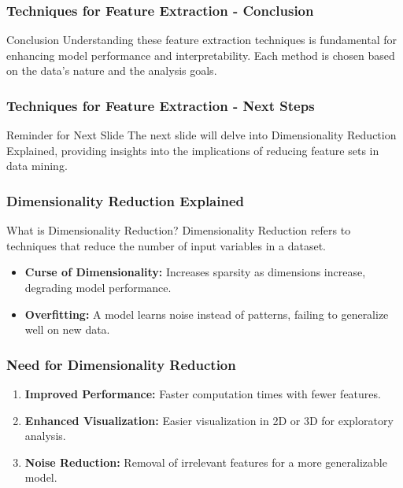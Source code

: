 \documentclass[aspectratio=169]{beamer}
\begin{document}
\begin{frame}[fragile]
    \frametitle{Techniques for Feature Extraction - Conclusion}
    \begin{block}{Conclusion}
        Understanding these feature extraction techniques is fundamental for enhancing model performance and interpretability. 
        Each method is chosen based on the data's nature and the analysis goals.
    \end{block}
\end{frame}

\begin{frame}[fragile]
    \frametitle{Techniques for Feature Extraction - Next Steps}
    \begin{block}{Reminder for Next Slide}
        The next slide will delve into Dimensionality Reduction Explained, providing insights into the implications of reducing feature sets in data mining.
    \end{block}
\end{frame}

\begin{frame}[fragile]
    \frametitle{Dimensionality Reduction Explained}
    \begin{block}{What is Dimensionality Reduction?}
        Dimensionality Reduction refers to techniques that reduce the number of input variables in a dataset. 
    \end{block}
    \begin{itemize}
        \item \textbf{Curse of Dimensionality:} Increases sparsity as dimensions increase, degrading model performance.
        \item \textbf{Overfitting:} A model learns noise instead of patterns, failing to generalize well on new data.
    \end{itemize}
\end{frame}

\begin{frame}[fragile]
    \frametitle{Need for Dimensionality Reduction}
    \begin{enumerate}
        \item \textbf{Improved Performance:} Faster computation times with fewer features. 
        \item \textbf{Enhanced Visualization:} Easier visualization in 2D or 3D for exploratory analysis.
        \item \textbf{Noise Reduction:} Removal of irrelevant features for a more generalizable model.
    \end{enumerate}
\end{frame}
\end{document}
